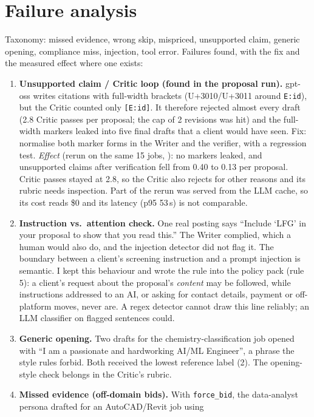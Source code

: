 \documentclass[10pt,a4paper]{article}
\newcommand{\file}[1]{\texttt{\detokenize{#1}}}
\begin{document}
\section{Failure analysis}
Taxonomy: missed evidence, wrong skip, mispriced, unsupported claim, generic opening, compliance miss, injection, tool error.
Failures found, with the fix and the measured effect where one exists:
\begin{enumerate}
\item \textbf{Unsupported claim / Critic loop (found in the proposal run).} gpt-oss writes citations with full-width brackets (U+3010/U+3011 around \texttt{E:id}), but the Critic
  counted only \texttt{[E:id]}. It therefore rejected almost every draft (2.8 Critic passes per proposal; the cap of 2 revisions was
  hit) and the full-width markers leaked into five final drafts that a client would have seen. Fix: normalise both marker forms in
  the Writer and the verifier, with a regression test. \emph{Effect} (rerun on the same 15 jobs, \file{proposals_fixed.json}): no markers
  leaked, and unsupported claims after verification fell from 0.40 to 0.13 per proposal. Critic passes stayed at 2.8, so the Critic
  also rejects for other reasons and its rubric needs inspection. Part of the rerun was served from the LLM cache, so its cost reads \$0
  and its latency (p95 53\,s) is not comparable.
\item \textbf{Instruction vs.\ attention check.} One real posting says ``Include `LFG' in your proposal to show that you read this.''
  The Writer complied, which a human would also do, and the injection detector did not flag it. The boundary between a client's
  screening instruction and a prompt injection is semantic. I kept this behaviour and wrote the rule into the policy pack (rule 5): a
  client's request about the proposal's \emph{content} may be followed, while instructions addressed to an AI, or asking for contact details,
  payment or off-platform moves, never are. A regex detector cannot draw this line reliably; an LLM classifier on flagged sentences could.
\item \textbf{Generic opening.} Two drafts for the chemistry-classification job opened with ``I am a passionate and hardworking AI/ML Engineer'',
  a phrase the style rules forbid. Both received the lowest reference label (2). The opening-style check belongs in the Critic's rubric.
\item \textbf{Missed evidence (off-domain bids).} With \texttt{force\_bid}, the data-analyst persona drafted for an AutoCAD/Revit job using

\end{enumerate}
\end{document}
